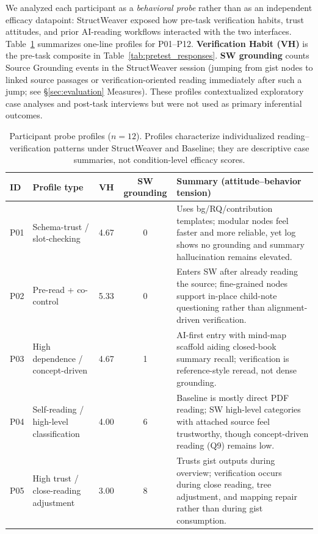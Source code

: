 \documentclass[manuscript,review,anonymous]{acmart}
\begin{document}
We analyzed each participant as a \emph{behavioral probe} rather than as an independent efficacy datapoint: StructWeaver exposed how pre-task verification habits, trust attitudes, and prior AI-reading workflows interacted with the two interfaces. Table~\ref{tab:probe_profiles} summarizes one-line profiles for P01--P12. \textbf{Verification Habit (VH)} is the pre-task composite in Table~\ref{tab:pretest_responses}. \textbf{SW grounding} counts Source Grounding events in the StructWeaver session (jumping from gist nodes to linked source passages or verification-oriented reading immediately after such a jump; see \S\ref{sec:evaluation} Measures). These profiles contextualized exploratory case analyses and post-task interviews but were not used as primary inferential outcomes.

\begin{table}[t]
\centering
\caption{Participant probe profiles ($n=12$). Profiles characterize individualized reading--verification patterns under StructWeaver and Baseline; they are descriptive case summaries, not condition-level efficacy scores.}
\label{tab:probe_profiles}
\small
\setlength{\tabcolsep}{3pt}
\begin{tabularx}{\linewidth}{l l c c X}
\toprule
\textbf{ID} & \textbf{Profile type} & \textbf{VH} & \textbf{SW grounding} & \textbf{Summary (attitude--behavior tension)} \\
\midrule
P01 & Schema-trust / slot-checking & 4.67 & 0 & Uses bg/RQ/contribution templates; modular nodes feel faster and more reliable, yet log shows no grounding and summary hallucination remains elevated. \\
P02 & Pre-read + co-control & 5.33 & 0 & Enters SW after already reading the source; fine-grained nodes support in-place child-note questioning rather than alignment-driven verification. \\
P03 & High dependence / concept-driven & 4.67 & 1 & AI-first entry with mind-map scaffold aiding closed-book summary recall; verification is reference-style reread, not dense grounding. \\
P04 & Self-reading / high-level classification & 4.00 & 6 & Baseline is mostly direct PDF reading; SW high-level categories with attached source feel trustworthy, though concept-driven reading (Q9) remains low. \\
P05 & High trust / close-reading adjustment & 3.00 & 8 & Trusts gist outputs during overview; verification occurs during close reading, tree adjustment, and mapping repair rather than during gist consumption. \\

\end{tabularx}
\end{table}
\end{document}
